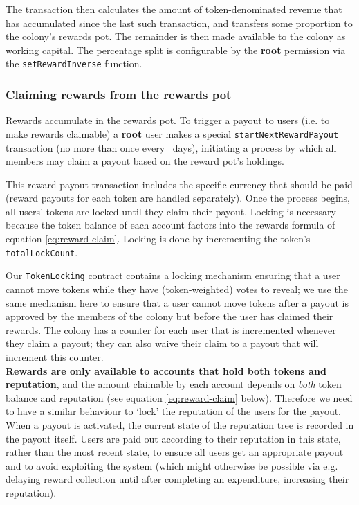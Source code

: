The transaction then calculates the amount of token-denominated revenue that has accumulated since the last such transaction, and transfers some proportion to the colony's rewards pot. The remainder is then made available to the colony as working capital. The percentage split is configurable by the \textbf{root} permission via the \texttt{setRewardInverse} function.

\subsubsection{Claiming rewards from the rewards pot}\label{sec:claimrewards}

Rewards accumulate in the rewards pot. To trigger a payout to users (i.e. to make rewards claimable) a \textbf{root} user makes a special \texttt{startNextRewardPayout} transaction (no more than once every \rewardclaimduration\ days), initiating a process by which all members may claim a payout based on the reward pot's holdings.

This reward payout transaction includes the specific currency that should be paid (reward payouts for each token are handled separately). Once the process begins, all users' tokens are locked until they claim their payout. Locking is necessary because the token balance of each account factors into the rewards formula of equation \eqref{eq:reward-claim}. Locking is done by incrementing the token's \texttt{totalLockCount}.

Our \texttt{TokenLocking} contract contains a locking mechanism ensuring that a user cannot move tokens while they have (token-weighted) votes to reveal; we use the same mechanism here to ensure that a user cannot move tokens after a payout is approved by the members of the colony but before the user has claimed their rewards. The colony has a counter for each user that is incremented whenever they claim a payout; they can also waive their claim to a payout that will increment this counter. \\

\textbf{Rewards are only available to accounts that hold both tokens and reputation}, and the amount claimable by each account depends on \emph{both} token balance and reputation (see equation \eqref{eq:reward-claim} below). Therefore we need to have a similar behaviour to `lock' the reputation of the users for the payout. When a payout is activated, the current state of the reputation tree is recorded in the payout itself. Users are paid out according to their reputation in this state, rather than the most recent state, to ensure all users get an appropriate payout and to avoid exploiting the system (which might otherwise be possible via e.g. delaying reward collection until after completing an expenditure, increasing their reputation).

